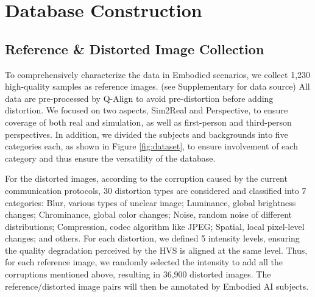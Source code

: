 \documentclass{article}
\begin{document}
\section{Database Construction}
\subsection{Reference \& Distorted Image Collection}

To comprehensively characterize the data in Embodied scenarios, we collect 1,230 high-quality samples as reference images. (see Supplementary for data source) All data are pre-processed by Q-Align \cite{quality:q-align} to avoid pre-distortion before adding distortion. We focused on two aspects, Sim2Real and Perspective, to ensure coverage of both real and simulation, as well as first-person and third-person perspectives. In addition, we divided the subjects and backgrounds into five categories each, as shown in Figure \ref{fig:dataset}, to ensure involvement of each category and thus ensure the versatility of the database.

For the distorted images, according to the corruption caused by the current communication protocols, 30 distortion types are considered and classified into 7 categories: Blur, various types of unclear image; Luminance, global brightness changes; Chrominance, global color changes; Noise, random noise of different distributions; Compression, codec algorithm like JPEG; Spatial, local pixel-level changes; and others. For each distortion, we defined 5 intensity levels, ensuring the quality degradation perceived by the HVS is aligned at the same level. Thus, for each reference image, we randomly selected the intensity to add all the corruptions mentioned above, resulting in 36,900 distorted images. The reference/distorted image pairs will then be annotated by Embodied AI subjects.
\end{document}
